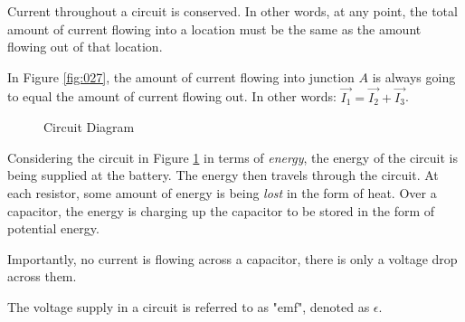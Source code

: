 \documentclass[12pt]{article}
\begin{document}
Current throughout a circuit is conserved. In other words, at any point, the total amount
of current flowing into a location must be the same as the amount flowing out of that
location.

In Figure \ref{fig:027}, the amount of current flowing into junction $A$ is always going
to equal the amount of current flowing out. In other words: $\overrightarrow{I_1} = \overrightarrow{I_2} + \overrightarrow{I_3}$.

\begin{figure}[H]
  \centering
  
  \caption{Circuit Diagram}
  \label{fig:029}
\end{figure}

Considering the circuit in Figure \ref{fig:029} in terms of \textit{energy}, the energy of
the circuit is being supplied at the battery. The energy then travels through the circuit.
At each resistor, some amount of energy is being \textit{lost} in the form of heat. Over a
capacitor, the energy is charging up the capacitor to be stored in the form of potential
energy.

Importantly, no current is flowing across a capacitor, there is only a voltage drop across
them.

The voltage supply in a circuit is referred to as "emf", denoted as $\epsilon$.
\end{document}
